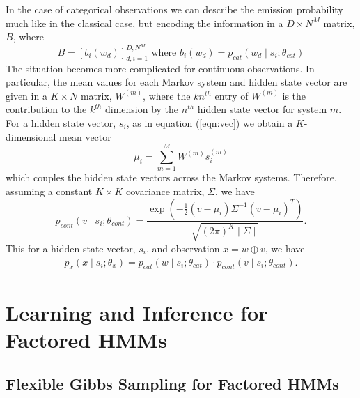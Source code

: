 \documentclass{amsart}
\begin{document}
In the case of categorical observations we can 
describe the emission probability much like in the classical case, but encoding 
the information in a $D\times N^M$ matrix, $B$, where 
\[
B = \left[b_{i}(w_d)\right]_{d,i=1}^{D,N^M} \text{ where }b_{i}(w_d) = p_{cat}(w_d\mid 
s_i;\theta_{cat})
\]
The situation becomes more complicated for continuous observations.  In 
particular, the mean values for each Markov system and hidden state vector are 
given in a $K\times N$ matrix, $W^{(m)}$, where the $kn^{th}$ entry 
of $W^{(m)}$ is the contribution to the $k^{th}$ dimension by the $n^{th}$ 
hidden state vector for system $m$. For a hidden state vector, $s_i$, as in 
equation (\ref{eqn:vec}) we obtain a $K$-dimensional mean vector
\[
\mu_i = \sum_{m=1}^M W^{(m)}s_i^{(m)}
\]
which couples the hidden state vectors across the Markov systems.
Therefore, assuming a constant $K\times K$ covariance matrix, $\Sigma$, we have 
\[
p_{cont}(v\mid s_i;\theta_{cont}) = 
\frac{\exp\left(-\frac{1}{2}\left(v-\mu_i\right)\Sigma^{-1}\left(v-\mu_i\right)^T\right)}{\sqrt{(2\pi)^K\mid \Sigma\mid}}.
\]
This for a hidden state vector, $s_i$, and observation $x=w\oplus v$, we have
\begin{eqnarray}
p_x(x\mid s_i; \theta_x) = p_{cat}(w\mid 
s_i;\theta_{cat})\cdot p_{cont}(v\mid s_i;\theta_{cont}) .
\end{eqnarray}


\section{Learning and Inference for Factored HMMs}

\subsection{Flexible Gibbs Sampling for Factored HMMs}
\end{document}
